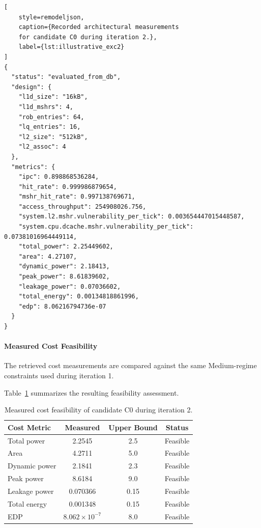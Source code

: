 \begin{lstlisting}[
    style=remodeljson,
    caption={Recorded architectural measurements
    for candidate C0 during iteration 2.},
    label={lst:illustrative_exc2}
]
{
  "status": "evaluated_from_db",
  "design": {
    "l1d_size": "16kB",
    "l1d_mshrs": 4,
    "rob_entries": 64,
    "lq_entries": 16,
    "l2_size": "512kB",
    "l2_assoc": 4
  },
  "metrics": {
    "ipc": 0.898868536284,
    "hit_rate": 0.999986879654,
    "mshr_hit_rate": 0.997138769671,
    "access_throughput": 254908026.756,
    "system.l2.mshr.vulnerability_per_tick": 0.003654447015448587,
    "system.cpu.dcache.mshr.vulnerability_per_tick": 0.07381016964449114,
    "total_power": 2.25449602,
    "area": 4.27107,
    "dynamic_power": 2.18413,
    "peak_power": 8.61839602,
    "leakage_power": 0.07036602,
    "total_energy": 0.00134818861996,
    "edp": 8.06216794736e-07
  }
}
\end{lstlisting}

\paragraph{Measured Cost Feasibility}

The retrieved cost measurements are compared
against the same Medium-regime constraints
used during iteration 1.

Table~\ref{tab:illustrative_exc2_cost}
summarizes the resulting feasibility assessment.

\begin{table}[htbp]
\centering
\caption{Measured cost feasibility of
candidate C0 during iteration 2.}
\label{tab:illustrative_exc2_cost}
\small
\renewcommand{\arraystretch}{1.1}
\begin{tabular}{lccc}
\hline
\textbf{Cost Metric} &
\textbf{Measured} &
\textbf{Upper Bound} &
\textbf{Status} \\
\hline
Total power & 2.2545 & 2.5 & Feasible \\
Area & 4.2711 & 5.0 & Feasible \\
Dynamic power & 2.1841 & 2.3 & Feasible \\
Peak power & 8.6184 & 9.0 & Feasible \\
Leakage power & 0.070366 & 0.15 & Feasible \\
Total energy & 0.001348 & 0.15 & Feasible \\
EDP & $8.062\times10^{-7}$ & 8.0 & Feasible \\
\hline
\end{tabular}
\end{table}

